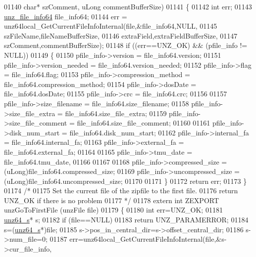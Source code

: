 \begin{DoxyCode}
01140                                           \textcolor{keywordtype}{char}* szComment,  uLong commentBufferSize)
01141 \{
01142     \textcolor{keywordtype}{int} err;
01143     \hyperlink{structunz__file__info64__s}{unz\_file\_info64} file\_info64;
01144     err = unz64local\_GetCurrentFileInfoInternal(file,&file\_info64,NULL,
01145                                                 szFileName,fileNameBufferSize,
01146                                                 extraField,extraFieldBufferSize,
01147                                                 szComment,commentBufferSize);
01148     \textcolor{keywordflow}{if} ((err==UNZ\_OK) && (pfile\_info != NULL))
01149     \{
01150         pfile\_info->version = file\_info64.version;
01151         pfile\_info->version\_needed = file\_info64.version\_needed;
01152         pfile\_info->flag = file\_info64.flag;
01153         pfile\_info->compression\_method = file\_info64.compression\_method;
01154         pfile\_info->dosDate = file\_info64.dosDate;
01155         pfile\_info->crc = file\_info64.crc;
01156 
01157         pfile\_info->size\_filename = file\_info64.size\_filename;
01158         pfile\_info->size\_file\_extra = file\_info64.size\_file\_extra;
01159         pfile\_info->size\_file\_comment = file\_info64.size\_file\_comment;
01160 
01161         pfile\_info->disk\_num\_start = file\_info64.disk\_num\_start;
01162         pfile\_info->internal\_fa = file\_info64.internal\_fa;
01163         pfile\_info->external\_fa = file\_info64.external\_fa;
01164 
01165         pfile\_info->tmu\_date = file\_info64.tmu\_date,
01166 
01167 
01168         pfile\_info->compressed\_size = (uLong)file\_info64.compressed\_size;
01169         pfile\_info->uncompressed\_size = (uLong)file\_info64.uncompressed\_size;
01170 
01171     \}
01172     \textcolor{keywordflow}{return} err;
01173 \}
01174 \textcolor{comment}{/*}
01175 \textcolor{comment}{  Set the current file of the zipfile to the first file.}
01176 \textcolor{comment}{  return UNZ\_OK if there is no problem}
01177 \textcolor{comment}{*/}
01178 \textcolor{keyword}{extern} \textcolor{keywordtype}{int} ZEXPORT unzGoToFirstFile (unzFile file)
01179 \{
01180     \textcolor{keywordtype}{int} err=UNZ\_OK;
01181     \hyperlink{structunz64__s}{unz64\_s}* s;
01182     \textcolor{keywordflow}{if} (file==NULL)
01183         \textcolor{keywordflow}{return} UNZ\_PARAMERROR;
01184     s=(\hyperlink{structunz64__s}{unz64\_s}*)file;
01185     s->pos\_in\_central\_dir=s->offset\_central\_dir;
01186     s->num\_file=0;
01187     err=unz64local\_GetCurrentFileInfoInternal(file,&s->cur\_file\_info,

\end{DoxyCode}

